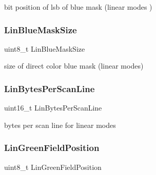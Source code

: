 bit position of lsb of blue mask (linear modes ) 

\hypertarget{structvbe__mode__info__t_ad8a25cec803bf91fb40a20a0aa5d5bf7}{}\label{structvbe__mode__info__t_ad8a25cec803bf91fb40a20a0aa5d5bf7} 
\subsubsection{\texorpdfstring{Lin\+Blue\+Mask\+Size}{LinBlueMaskSize}}
{\footnotesize\ttfamily uint8\+\_\+t Lin\+Blue\+Mask\+Size}



size of direct color blue mask (linear modes) 

\hypertarget{structvbe__mode__info__t_a53c5060b6ac14a7418ca8421edfb9981}{}\label{structvbe__mode__info__t_a53c5060b6ac14a7418ca8421edfb9981} 
\subsubsection{\texorpdfstring{Lin\+Bytes\+Per\+Scan\+Line}{LinBytesPerScanLine}}
{\footnotesize\ttfamily uint16\+\_\+t Lin\+Bytes\+Per\+Scan\+Line}



bytes per scan line for linear modes 

\hypertarget{structvbe__mode__info__t_a6683a63711dbc5dfb9a2a59c55deecd5}{}\label{structvbe__mode__info__t_a6683a63711dbc5dfb9a2a59c55deecd5} 
\subsubsection{\texorpdfstring{Lin\+Green\+Field\+Position}{LinGreenFieldPosition}}
{\footnotesize\ttfamily uint8\+\_\+t Lin\+Green\+Field\+Position}



